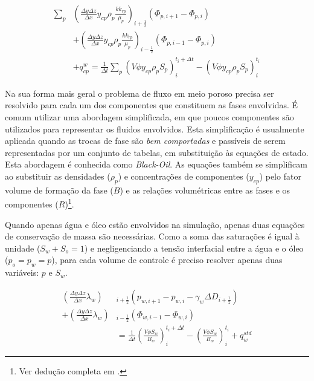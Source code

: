 \documentclass[final,5p]{elsarticle}
\numberwithin{equation}{section}
\begin{document}
        \begin{align}
            \sum_{p} & \left( \frac{\Delta y \Delta z}{\Delta x} y_{cp} \rho_p \frac{k k_{rp}}{\mu_p} \right)_{i+\tfrac{1}{2}} (\Phi_{p,i+1} - \Phi_{p,i})  \nonumber \\
            & + \left( \frac{\Delta y \Delta z}{\Delta x} y_{cp} \rho_p \frac{k k_{rp}}{\mu_p} \right)_{i-\tfrac{1}{2}} (\Phi_{p,i-1} - \Phi_{p,i}) \nonumber \\
            & + q_{cp}^{w} = \frac{1}{\Delta t} \sum_{p} (V \phi y_{cp} \rho_p S_p)_i^{t_i+\Delta t} - (V \phi y_{cp} \rho_p S_p)_i^{t_i} \label{eq:geralumd}
        \end{align}

        Na sua forma mais geral o problema de fluxo em meio poroso precisa ser resolvido para cada um dos componentes que constituem as fases envolvidas. É comum utilizar uma abordagem simplificada, em que poucos componentes são utilizados para representar os fluidos envolvidos. Esta simplificação é usualmente aplicada quando as trocas de fase são \emph{bem comportadas} e passíveis de serem representadas por um conjunto de tabelas, em substituição às equações de estado. Esta abordagem é conhecida como \emph{Black-Oil}. As equações também se simplificam ao substituir as densidades ($\rho_p$) e concentrações de componentes ($y_{cp}$) pelo fator volume de formação da fase ($B$) e as relações volumétricas entre as fases e os componentes ($R$)\footnote{Ver dedução completa em \cite{dake1983fundamentals}.}.

        Quando apenas água e óleo estão envolvidos na simulação, apenas duas equações de conservação de massa são necessárias. Como a soma das saturações é igual à unidade ($S_w + S_o = 1$) e negligenciando a tensão interfacial entre a água e o óleo ($p_o = p_w = p$), para cada volume de controle é preciso resolver apenas duas variáveis: $p$ e $S_w$.

        \begin{align}
            \left( \frac{\Delta y \Delta z}{\Delta x} \lambda_w \right)&_{i+\tfrac{1}{2}} (p_{w,i+1} - p_{w,i} - \gamma_w \Delta D_{i+\tfrac{1}{2}})  \nonumber \\
            + \left( \frac{\Delta y \Delta z}{\Delta x} \lambda_w \right)&_{i-\tfrac{1}{2}} (\Phi_{w,i-1} - \Phi_{w,i}) \nonumber \\
            &  = \frac{1}{\Delta t} \left(\frac{V \phi S_w}{B_w}\right)_i^{t_i+\Delta t} - \left(\frac{V \phi S_w}{B_w}\right)_i^{t_i} + q^{std}_w\label{eq:blackoilumd}
        \end{align}
\end{document}
